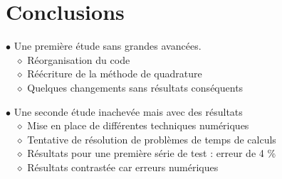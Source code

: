 \documentclass[9pt]{beamer}
\begin{document}
	
	\section{Conclusions}
	
	\sommaire{}
	
		\begin{frame}
	\justifying
	\vspace*{22pt}
	
	$\bullet$ Une première étude sans grandes avancées. \\
	\vspace*{5pt}
		$\quad \diamond$ Réorganisation du code \\
		$\quad \diamond$ Réécriture de la méthode de quadrature \\
		$\quad \diamond$ Quelques changements sans résultats conséquents\\
	
	\vspace*{15pt}
	
	$\bullet$ Une seconde étude inachevée mais avec des résultats\\
		\vspace*{5pt}
	$\quad \diamond$ Mise en place de différentes techniques numériques\\
	$\quad \diamond$ Tentative de résolution de problèmes de temps de calculs\\
	$\quad \diamond$ Résultats pour une première série de test : erreur de 4 \%\\
	$\quad \diamond$ Résultats contrastée car erreurs numériques
	
	
	\end{frame}
	
	
\end{document}
